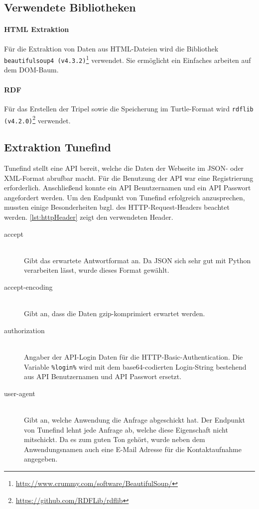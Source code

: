 \documentclass[parskip]{scrartcl}
\begin{document}
\subsection{Verwendete Bibliotheken}

\paragraph{HTML Extraktion}
Für die Extraktion von Daten aus HTML-Dateien wird die Bibliothek \texttt{beautifulsoup4  (v4.3.2)}\footnote{\href{http://www.crummy.com/software/BeautifulSoup/}{http://www.crummy.com/software/BeautifulSoup/}} verwendet. Sie ermöglicht ein Einfaches arbeiten auf dem DOM-Baum.

\paragraph{RDF}
Für das Erstellen der Tripel sowie die Speicherung im Turtle-Format wird \texttt{rdflib (v4.2.0)}\footnote{\href{https://github.com/RDFLib/rdflib}{https://github.com/RDFLib/rdflib}} verwendet. 

\subsection{Extraktion Tunefind}

Tunefind stellt eine API bereit, welche die Daten der Webseite im JSON- oder XML-Format abrufbar macht. Für die Benutzung der API war eine Registrierung erforderlich. Anschließend konnte ein API Benutzernamen und ein API Passwort angefordert werden.
Um den Endpunkt von Tunefind erfolgreich anzusprechen, mussten einige Besonderheiten bzgl. des HTTP-Request-Headers beachtet werden. \autoref{lst:httpHeader} zeigt den verwendeten Header.



\begin{description}
    \item[accept] \hfill \\
        Gibt das erwartete Antwortformat an. Da JSON sich sehr gut mit Python verarbeiten lässt, wurde dieses Format gewählt.
    \item[accept-encoding] \hfill \\
        Gibt an, dass die Daten gzip-komprimiert erwartet werden.
    \item[authorization] \hfill \\
        Angaber der API-Login Daten für die HTTP-Basic-Authentication.
        Die Variable \texttt{\%login\%} wird mit dem base64-codierten Login-String bestehend aus API Benutzernamen und API Passwort ersetzt.
    \item[user-agent] \hfill \\
        Gibt an, welche Anwendung die Anfrage abgeschickt hat. Der Endpunkt von Tunefind lehnt jede Anfrage ab, welche diese Eigenschaft nicht mitschickt. Da es zum guten Ton gehört, wurde neben dem Anwendungsnamen auch eine E-Mail Adresse für die Kontaktaufnahme angegeben.
\end{description}
\end{document}
